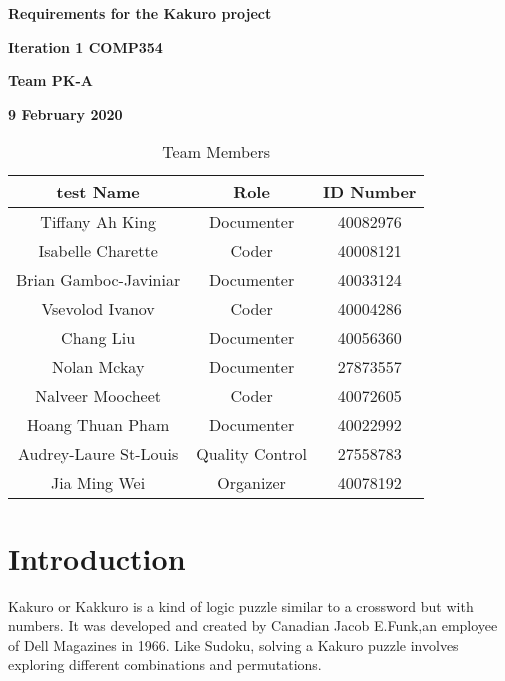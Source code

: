 \documentclass[12pt]{article}
\begin{document}
\vspace*{0.5in}
\centerline{\bf\Large
Requirements for the Kakuro project}

\vspace*{0.5in}
\centerline{\bf\Large Iteration 1 COMP354}

\vspace*{0.5in}
\centerline{\bf\Large Team PK-A}

\vspace*{0.5in}
\centerline{\bf\Large 9 February 2020}

\vspace*{1.5in}
\begin{table}[htbp]
\caption{Team Members}
\begin{center}
\begin{tabular}{|c |c | c|}
\hline
test Name & Role & ID Number \\
\hline\hline
Tiffany Ah King & Documenter & 40082976 \\
\hline
Isabelle Charette & Coder & 40008121 \\
\hline
Brian Gamboc-Javiniar & Documenter & 40033124 \\
\hline
Vsevolod Ivanov & Coder & 40004286 \\
\hline
Chang Liu & Documenter & 40056360 \\
\hline
Nolan Mckay & Documenter & 27873557 \\
\hline
Nalveer Moocheet & Coder & 40072605 \\
\hline
Hoang Thuan Pham & Documenter & 40022992 \\
\hline
Audrey-Laure St-Louis & Quality Control & 27558783 \\
\hline
Jia Ming Wei & Organizer & 40078192 \\
\hline
\end{tabular}
\end{center}
\end{table}


\newpage



 \renewcommand*\contentsname{Table of Contents}

 

\tableofcontents


\newpage
\section{Introduction}


Kakuro or Kakkuro  is a kind of logic puzzle similar to a crossword but with numbers. It was developed and created by Canadian Jacob E.Funk,an employee of Dell Magazines in 1966. Like Sudoku, solving a Kakuro puzzle involves exploring different combinations and permutations.\\
\end{document}
